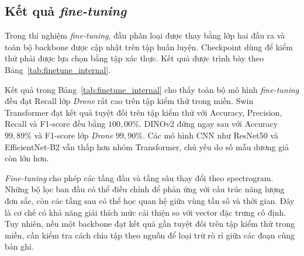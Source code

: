 \documentclass[../DoAn.tex]{subfiles}
\begin{document}
\subsection{Kết quả \textit{fine-tuning}}

Trong thí nghiệm \textit{fine-tuning}, đầu phân loại được thay bằng lớp hai đầu ra và toàn bộ backbone được cập nhật trên tập huấn luyện. Checkpoint dùng để kiểm thử phải được lựa chọn bằng tập xác thực. Kết quả được trình bày theo Bảng~\ref{tab:finetune_internal}.

\begin{table}[H]
    \centering
    \renewcommand{\arraystretch}{1.3}
    \small
    \setlength{\tabcolsep}{4pt}
    \caption{Kết quả \textit{fine-tuning} mô hình trên tập kiểm thử trong miền}
    \label{tab:finetune_internal}

\end{table}

Kết quả trong Bảng~\ref{tab:finetune_internal} cho thấy toàn bộ mô hình \textit{fine-tuning} đều đạt Recall lớp \textit{Drone} rất cao trên tập kiểm thử trong miền. Swin Transformer đạt kết quả tuyệt đối trên tập kiểm thử với Accuracy, Precision, Recall và F1-score đều bằng $100{,}00\%$. DINOv2 đứng ngay sau với Accuracy $99{,}89\%$ và F1-score lớp \textit{Drone} $99{,}90\%$. Các mô hình CNN như ResNet50 và EfficientNet-B2 vẫn thấp hơn nhóm Transformer, chủ yếu do số mẫu dương giả còn lớn hơn.

\textit{Fine-tuning} cho phép các tầng đầu và tầng sâu thay đổi theo spectrogram. Những bộ lọc ban đầu có thể điều chỉnh để phản ứng với cấu trúc năng lượng đơn sắc, còn các tầng sau có thể học quan hệ giữa vùng tần số và thời gian. Đây là cơ chế có khả năng giải thích mức cải thiện so với vector đặc trưng cố định. Tuy nhiên, nếu một backbone đạt kết quả gần tuyệt đối trên tập kiểm thử trong miền, cần kiểm tra cách chia tập theo nguồn để loại trừ rò rỉ giữa các đoạn cùng bản ghi.
\end{document}
